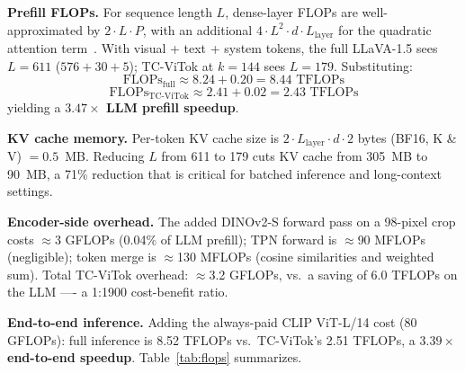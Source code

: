 \documentclass{article}
\begin{document}
\textbf{Prefill FLOPs.}
For sequence length $L$, dense-layer FLOPs are well-approximated by
$2 \cdot L \cdot P$, with an additional $4 \cdot L^2 \cdot d \cdot L_{\mathrm{layer}}$
for the quadratic attention term~\cite{kaplan2020scaling}.
With visual + text + system tokens, the full LLaVA-1.5 sees $L{=}611$
($576 + 30 + 5$); TC-ViTok at $k{=}144$ sees $L{=}179$.
Substituting:
\[
\mathrm{FLOPs}_{\mathrm{full}} \approx 8.24 + 0.20 = 8.44 \text{ TFLOPs}
\]
\[
\mathrm{FLOPs}_{\mathrm{TC\text{-}ViTok}} \approx 2.41 + 0.02 = 2.43 \text{ TFLOPs}
\]
yielding a \textbf{$3.47{\times}$ LLM prefill speedup}.

\textbf{KV cache memory.}
Per-token KV cache size is $2 \cdot L_{\mathrm{layer}} \cdot d \cdot 2$ bytes
(BF16, K \& V) $= 0.5$~MB.
Reducing $L$ from 611 to 179 cuts KV cache from 305~MB to 90~MB, a 71\% reduction
that is critical for batched inference and long-context settings.

\textbf{Encoder-side overhead.}
The added DINOv2-S forward pass on a 98-pixel crop costs $\approx$3 GFLOPs
(0.04\% of LLM prefill); TPN forward is $\approx$90 MFLOPs (negligible);
token merge is $\approx$130 MFLOPs (cosine similarities and weighted sum).
Total TC-ViTok overhead: $\approx$3.2 GFLOPs, vs.\ a saving of $6.0$ TFLOPs
on the LLM —- a 1{:}1900 cost-benefit ratio.

\textbf{End-to-end inference.}
Adding the always-paid CLIP ViT-L/14 cost (80 GFLOPs):
full inference is 8.52 TFLOPs vs.\ TC-ViTok's 2.51 TFLOPs, a
\textbf{$3.39{\times}$ end-to-end speedup}.
Table~\ref{tab:flops} summarizes.

\begin{table}[t]
\caption{FLOPs and KV cache analysis on LLaVA-1.5-7B. Speedup is computed
relative to full LLaVA-1.5 inference. End-to-end includes the always-paid
CLIP ViT-L/14 encoder cost.}
\label{tab:flops}
\vskip 0.1in
\centering
{}
\end{table}
\end{document}
